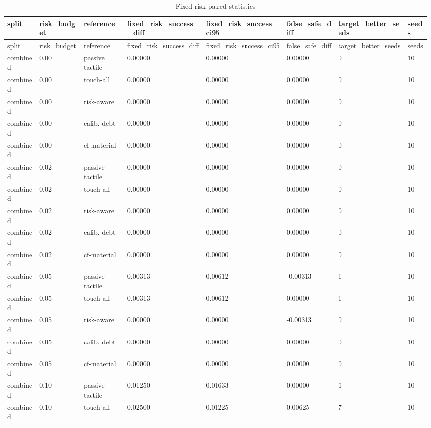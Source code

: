 \documentclass{article}
\begin{document}
\begin{center}
\tiny
\renewcommand{\arraystretch}{0.92}
\setlength{\tabcolsep}{3pt}
\begin{longtable}{llllllll}
\caption{Fixed-risk paired statistics}\label{tab:fixed-pair-full}\\
\toprule
split & risk\_budget & reference & fixed\_risk\_success\_diff & fixed\_risk\_success\_ci95 & false\_safe\_diff & target\_better\_seeds & seeds \\
\midrule
\endfirsthead
\toprule
split & risk\_budget & reference & fixed\_risk\_success\_diff & fixed\_risk\_success\_ci95 & false\_safe\_diff & target\_better\_seeds & seeds \\
\midrule
\endhead
combined & 0.00 & passive tactile & 0.00000 & 0.00000 & 0.00000 & 0 & 10 \\
combined & 0.00 & touch-all & 0.00000 & 0.00000 & 0.00000 & 0 & 10 \\
combined & 0.00 & risk-aware & 0.00000 & 0.00000 & 0.00000 & 0 & 10 \\
combined & 0.00 & calib. debt & 0.00000 & 0.00000 & 0.00000 & 0 & 10 \\
combined & 0.00 & cf-material & 0.00000 & 0.00000 & 0.00000 & 0 & 10 \\
combined & 0.02 & passive tactile & 0.00000 & 0.00000 & 0.00000 & 0 & 10 \\
combined & 0.02 & touch-all & 0.00000 & 0.00000 & 0.00000 & 0 & 10 \\
combined & 0.02 & risk-aware & 0.00000 & 0.00000 & 0.00000 & 0 & 10 \\
combined & 0.02 & calib. debt & 0.00000 & 0.00000 & 0.00000 & 0 & 10 \\
combined & 0.02 & cf-material & 0.00000 & 0.00000 & 0.00000 & 0 & 10 \\
combined & 0.05 & passive tactile & 0.00313 & 0.00612 & -0.00313 & 1 & 10 \\
combined & 0.05 & touch-all & 0.00313 & 0.00612 & 0.00000 & 1 & 10 \\
combined & 0.05 & risk-aware & 0.00000 & 0.00000 & -0.00313 & 0 & 10 \\
combined & 0.05 & calib. debt & 0.00000 & 0.00000 & 0.00000 & 0 & 10 \\
combined & 0.05 & cf-material & 0.00000 & 0.00000 & 0.00000 & 0 & 10 \\
combined & 0.10 & passive tactile & 0.01250 & 0.01633 & 0.00000 & 6 & 10 \\
combined & 0.10 & touch-all & 0.02500 & 0.01225 & 0.00625 & 7 & 10 \\

\end{longtable}
\end{center}
\end{document}
